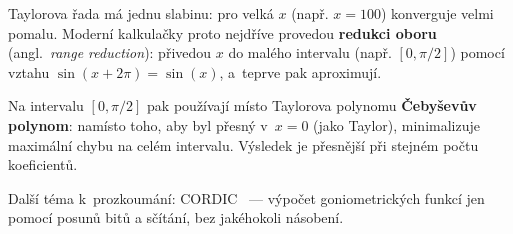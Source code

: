 \documentclass[12pt, a4paper]{article}
\begin{document}
Taylorova řada má jednu slabinu: pro velká $x$ (např. $x = 100$)
konverguje velmi pomalu. Moderní kalkulačky proto nejdříve provedou
\textbf{redukci oboru} (angl.\ \emph{range reduction}): přivedou $x$ do malého
intervalu (např. $[0, \pi/2]$) pomocí vztahu $\sin(x + 2\pi) = \sin(x)$,
a~teprve pak aproximují.

Na intervalu $[0, \pi/2]$ pak používají místo Taylorova polynomu
\textbf{Čebyševův polynom}: namísto toho, aby byl přesný v~$x = 0$
(jako Taylor), minimalizuje maximální chybu na celém intervalu.
Výsledek je přesnější při stejném počtu koeficientů.

Další téma k~prozkoumání: CORDIC~\cite{volder1959} ---
výpočet goniometrických funkcí jen pomocí posunů bitů a sčítání,
bez jakéhokoli násobení.

\printbibliography[title={Literatura}]

\end{document}
